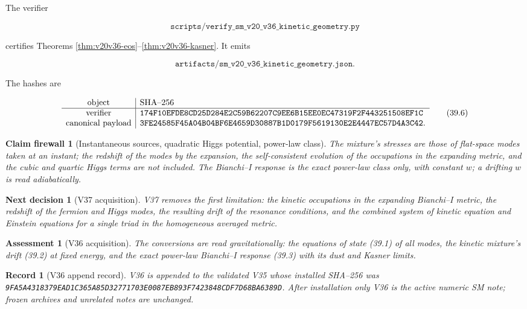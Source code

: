 \documentclass[11pt]{article}
\newtheorem{firewall}[theorem]{Claim firewall}
\newtheorem{decision}[theorem]{Next decision}
\newtheorem{assessment}[theorem]{Assessment}
\newtheorem{record}[theorem]{Record}
\theoremstyle{remark}
\begin{document}
The verifier

\[
 \texttt{scripts/verify\_sm\_v20\_v36\_kinetic\_geometry.py}          \tag{39.4}
\]

certifies Theorems \ref{thm:v20v36-eos}--\ref{thm:v20v36-kasner}.
It emits

\[
 \texttt{artifacts/sm\_v20\_v36\_kinetic\_geometry.json}.             \tag{39.5}
\]

The hashes are

\[
\begin{array}{c|l}
\hbox{object}&\hbox{SHA--256}\\ \hline
\hbox{verifier}&
\texttt{174F10EFDE8CD25D284E2C59B62207C9EE6B15EE0EC47319F2F443251508EF1C}\\
\hbox{canonical payload}&
\texttt{3FE24585F45A04B04BF6E4659D30887B1D0179F5619130E2E4447EC57D4A3C42}.
\end{array}                                                     \tag{39.6}
\]

\begin{firewall}[Instantaneous sources, quadratic Higgs potential, power-law class]
\label{fire:v20v36}
The mixture's stresses are those of flat-space modes taken at an
instant; the redshift of the modes by the expansion, the
self-consistent evolution of the occupations in the expanding
metric, and the cubic and quartic Higgs terms are not included.  The
Bianchi--I response is the exact power-law class only, with
constant \(w\); a drifting \(w\) is read adiabatically.
\end{firewall}

\begin{decision}[V37 acquisition]
\label{dec:v20v36-next}
V37 removes the first limitation: the kinetic occupations in the
expanding Bianchi--I metric, the redshift of the fermion and Higgs
modes, the resulting drift of the resonance conditions, and the
combined system of kinetic equation and Einstein equations for a
single triad in the homogeneous averaged metric.
\end{decision}

\begin{assessment}[V36 acquisition]
\label{ass:v20v36}
The conversions are read gravitationally: the equations of state
(39.1) of all modes, the kinetic mixture's drift (39.2) at fixed
energy, and the exact power-law Bianchi--I response (39.3) with its
dust and Kasner limits.
\end{assessment}

\begin{record}[V36 append record]
\label{rec:v20v36}
V36 is appended to the validated V35 whose installed SHA--256 was
\texttt{9FA5A4318379EAD1C365A85D32771703E0087EB893F7423848CDF7D68BA6389D}.
After installation only V36 is the active numeric SM note; frozen
archives and unrelated notes are unchanged.
\end{record}
\end{document}
